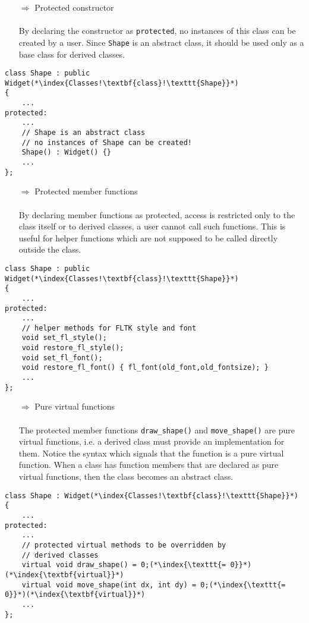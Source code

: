 \documentclass[10pt]{article}
\begin{document}
\begin{enumerate}
\item[$\Rightarrow$] Protected constructor\\ \\ By declaring the constructor as \texttt{protected}, no instances of this class can be created by a user. Since \texttt{Shape} is an abstract class, it should be used only as a base class for derived classes.
\end{enumerate}
\begin{lstlisting}
class Shape : public Widget(*\index{Classes!\textbf{class}!\texttt{Shape}}*)
{
    ...
protected:
    ...
    // Shape is an abstract class
    // no instances of Shape can be created!
    Shape() : Widget() {}
    ...
};
\end{lstlisting}
\begin{enumerate}
\item[$\Rightarrow$] Protected member functions\\ \\ By declaring member functions as protected, access is restricted only to the class itself or to derived classes, a user cannot call such functions. This is useful for helper functions which are not supposed to be called directly outside the class.
\end{enumerate}
\begin{lstlisting}
class Shape : public Widget(*\index{Classes!\textbf{class}!\texttt{Shape}}*)
{
    ...
protected:
    ...
    // helper methods for FLTK style and font
    void set_fl_style();
    void restore_fl_style();
    void set_fl_font();
    void restore_fl_font() { fl_font(old_font,old_fontsize); }
    ...
};
\end{lstlisting}
\begin{enumerate}
\item[$\Rightarrow$] Pure virtual functions\\ \\ The protected member functions \texttt{draw\_shape()} and \texttt{move\_shape()} are pure virtual functions, i.e. a derived class must provide an implementation for them. Notice the syntax  which signals that the function is a pure virtual function. When a class has function members that are declared as pure virtual functions, then the class becomes an abstract class.
\end{enumerate}
\begin{lstlisting}
class Shape : Widget(*\index{Classes!\textbf{class}!\texttt{Shape}}*)
{
    ...
protected:
    ...
    // protected virtual methods to be overridden by 
    // derived classes
    virtual void draw_shape() = 0;(*\index{\texttt{= 0}}*)(*\index{\textbf{virtual}}*)
    virtual void move_shape(int dx, int dy) = 0;(*\index{\texttt{= 0}}*)(*\index{\textbf{virtual}}*)
    ...
};
\end{lstlisting}
\end{document}
